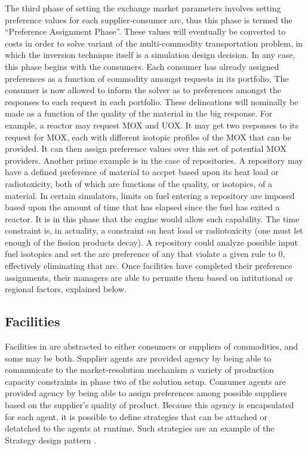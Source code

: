 The third phase of setting the exchange market parameters involves setting
preference values for each supplier-consumer arc, thus this phase is termed the
``Preference Assignment Phase''. These values will eventually be converted to
costs in order to solve variant of the multi-commodity transportation problem,
in which the inversion technique itself is a simulation design decision. In any
case, this phase begins with the consumers. Each consumer has already assigned
preferences as a function of commodity amongst requests in its portfolio. The
consumer is now allowed to inform the solver as to preferences amongst the
responses to each request in each portfolio. These delineations will nominally
be made as a function of the quality of the material in the big response. For
example, a reactor may request MOX and UOX. It may get two responses to its
request for MOX, each with different isotopic profiles of the MOX that can be
provided. It can then assign preference values over this set of potential MOX
providers. Another prime example is in the case of repositories. A repository
may have a defined preference of material to accpet based upon its heat load or
radiotoxicity, both of which are functions of the quality, or isotopics, of a
material. In certain simulators, limits on fuel entering a repository are
imposed based upon the amount of time that has elapsed since the fuel has exited
a reactor. It is in this phase that the \Cyclus engine would allow such
capability. The time constraint is, in actuality, a constraint on heat load or
radiotoxicity (one must let enough of the fission products decay). A repository
could analyze possible input fuel isotopics and set the arc preference of any
that violate a given rule to 0, effectively eliminating that arc. Once
facilities have completed their preference assignments, their managers are able
to permute them based on intitutional or regional factors, explained below.

\subsection{Facilities}

Facilities in \Cyclus are abstracted to either consumers or suppliers of
commodities, and some may be both. Supplier agents are provided agency by being
able to communicate to the market-resolution mechanism a variety of production
capacity constraints in phase two of the solution setup. Consumer agents are
provided agency by being able to assign preferences among possible suppliers
based on the supplier's quality of product. Because this agency is encapsulated
for each agent, it is possible to define strategies that can be attached or
detatched to the agents at runtime. Such strategies are an example of the
Strategy design pattern \cite{vlissides_design_1995}.

